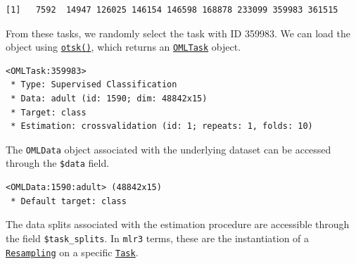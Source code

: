 \begin{Shaded}
\begin{Highlighting}[]
\NormalTok{adult\_tasks[task\_type }\SpecialCharTok{==} \NormalTok{, task\_id]}
\end{Highlighting}
\end{Shaded}

\begin{verbatim}
[1]   7592  14947 126025 146154 146598 168878 233099 359983 361515
\end{verbatim}

From these tasks, we randomly select the task with ID 359983. We can
load the object using
\href{https://mlr3oml.mlr-org.com/reference/oml_sugar.html}{\texttt{otsk()}},
which returns an
\href{https://mlr3oml.mlr-org.com/reference/oml_task.html}{\texttt{OMLTask}}
object.

\begin{Shaded}
\begin{Highlighting}[]
\OtherTok{=} \NormalTok{(} \NormalTok{)}
\end{Highlighting}
\end{Shaded}

\begin{verbatim}
<OMLTask:359983>
 * Type: Supervised Classification
 * Data: adult (id: 1590; dim: 48842x15)
 * Target: class
 * Estimation: crossvalidation (id: 1; repeats: 1, folds: 10)
\end{verbatim}

The \texttt{OMLData} object associated with the underlying dataset can
be accessed through the \texttt{\$data} field.

\begin{Shaded}
\begin{Highlighting}[]
\SpecialCharTok{$}
\end{Highlighting}
\end{Shaded}

\begin{verbatim}
<OMLData:1590:adult> (48842x15)
 * Default target: class
\end{verbatim}

The data splits associated with the estimation procedure are accessible
through the field \texttt{\$task\_splits}. In \texttt{mlr3} terms, these
are the instantiation of a
\href{https://mlr3.mlr-org.com/reference/Resampling.html}{\texttt{Resampling}}
on a specific
\href{https://mlr3.mlr-org.com/reference/Task.html}{\texttt{Task}}.

